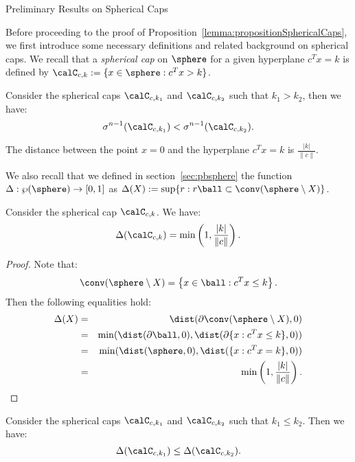 \begin{section}{Preliminary Results on Spherical Caps}\label{sec:app_prelim_caps}

Before proceeding to the proof of Proposition~\ref{lemma:propositionSphericalCaps}, we first introduce some necessary definitions and related background on spherical caps. We recall that a \emph{spherical cap} on $\sphere$ for a given hyperplane $c^Tx = k$ is defined by $\calC_{c,k} := \{x \in \sphere : c^Tx >k\}$.


\begin{remark}\label{lemma:muMonotone}
Consider the spherical caps $\calC_{c, k_1}$ and $\calC_{c, k_2}$ such that $k_1 > k_2$, then we have:
$$\sigma^{n-1}(\calC_{c,k_1}) < \sigma^{n-1}(\calC_{c,k_2}).$$
\end{remark}


\begin{remark}\label{prop:distance}
The distance between the point $x=0$ and the hyperplane $c^Tx = k$ is $\frac{|k|}{\|c\|}$.
\end{remark}

We also recall that we defined in section~\ref{sec:pbsphere} the function $\Delta: \wp(\sphere) \to [0,1]$ as $\Delta(X) := \sup \{r: r\ball \subset \conv(\sphere \setminus X)\}$.


\begin{lemma} \label{lemma:delta2} 
Consider the spherical cap $\calC_{c,k}$. We have:
$$\Delta(\calC_{c,k}) = \min\left(1, \frac{|k|}{\|c\|}\right).$$
\end{lemma}

\begin{proof}
Note that: $$\conv(\sphere \setminus X)= \left\{x \in \ball : c^Tx \leq k \right\}.$$
Then the following equalities hold:
\begin{eqnarray}
\nonumber \Delta(X) &=& \dist(\partial \conv(\sphere \setminus X), 0) \\
\nonumber &=& \min(\dist(\partial \ball, 0), \dist(\partial\{x : c^Tx \leq k\}, 0)) \\
\nonumber &=& \min(\dist(\sphere, 0), \dist(\{x : c^Tx = k\}, 0)) \\
\nonumber &=& \min\left(1, \frac{|k|}{\|c\|}\right).
\end{eqnarray}
\end{proof}

\begin{corollary}\label{lemma:deltaMonotone} 
Consider the spherical caps $\calC_{c, k_1}$ and $\calC_{c, k_2}$ such that $k_1 \leq k_2$. Then we have: $$\Delta(\calC_{c,k_1}) \leq \Delta(\calC_{c,k_2}).$$
\end{corollary}


\end{section}
